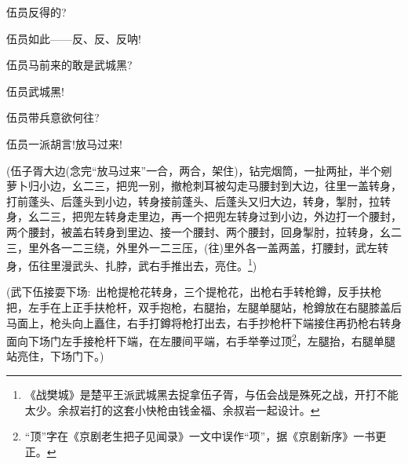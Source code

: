 {伍员\hspace{30pt}反得的?

伍员\hspace{30pt}如此------反、反、反呐!




\vspace{5pt}

伍员\hspace{30pt}马前来的敢是武城黑?

伍员\hspace{30pt}武城黑!

伍员\hspace{30pt}带兵意欲何往?

伍员\hspace{30pt}一派胡言!放马过来!

(伍子胥{\hwfs 大边}({\hwfs 念完}``{放马过来}''{\hwfs 一合}，{\hwfs 两合}，{\hwfs 架住})，{\hwfs 钻完烟筒}，{\hwfs 一扯两扯}，{\hwfs 半个剜萝卜归小边}，{\hwfs 幺二三}，{\hwfs 把兜一别}，{\hwfs 撤枪刺耳被勾走马腰封到大边}，{\hwfs 往里一盖转身}，{\hwfs 打前蓬头}、{\hwfs 后蓬头到小边}，{\hwfs 转身接前蓬头}、{\hwfs 后蓬头又归大边}，{\hwfs 转身}，{\hwfs 掣肘}，{\hwfs 拉转身}，{\hwfs 幺二三}，{\hwfs 把兜左转身走里边}，{\hwfs 再一个把兜左转身过到小边}，{\hwfs 外边打一个腰封}，{\hwfs 两个腰封}，{\hwfs 被盖右转身到里边}、{\hwfs 接一个腰封}、{\hwfs 两个腰封}，{\hwfs 回身掣肘}，{\hwfs 拉转身}，{\hwfs 幺二三}，{\hwfs 里外各一二三绕}，{\hwfs 外里外一二三压}，({\hwfs 往}){\hwfs 里外各一盖两盖}，{\hwfs 打腰封}，武{\hwfs 左转身}，伍{\hwfs 往里漫}武{\hwfs 头}、{\hwfs 扎脖}，武{\hwfs 右手推出去}，{\hwfs 亮住}。\footnote{ {《战樊城》是楚平王派武城黑去捉拿伍子胥}，{与伍会战是殊死之战}，{开打不能太少}。{余叔岩打的这套小快枪由钱金福、余叔岩一起设计。}})

(武{\hwfs 下}伍{\hwfs 接耍下场}:~{\hwfs 出枪提枪花转身}，{\hwfs 三个提枪花}，{\hwfs 出枪右手转枪鐏}，{\hwfs 反手扶枪把}，{\hwfs 左手在上正手扶枪杆}，{\hwfs 双手抱枪}，{\hwfs 右腿抬}，{\hwfs 左腿单腿站}，{\hwfs 枪鐏放在右腿膝盖后马面上}，{\hwfs 枪头向上矗住}，{\hwfs 右手打鐏将枪打出去}，{\hwfs 右手抄枪杆下端接住再扔枪右转身面向下场门左手接枪杆下端}，{\hwfs 在左腰间平端}，{\hwfs 右手举拳过顶}\footnote{ ``顶''字在《京剧老生把子见闻录》一文中误作``项''，据《京剧新序》一书更正。}，{\hwfs 左腿抬}，{\hwfs 右腿单腿站亮住}，{\hwfs 下场门下}。)

}
